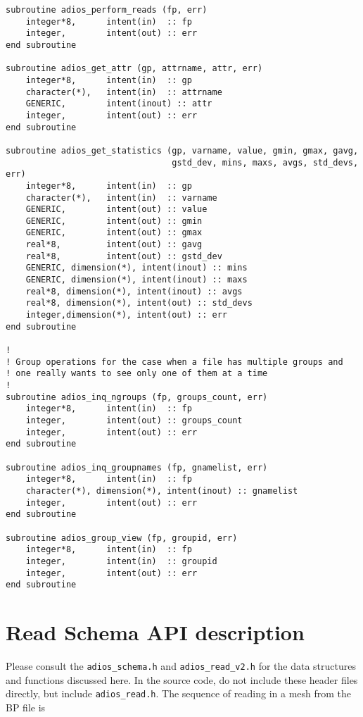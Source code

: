 \begin{lstlisting}[language=ADIOS,alsolanguage=Fortran]
subroutine adios_perform_reads (fp, err)
    integer*8,      intent(in)  :: fp
    integer,        intent(out) :: err
end subroutine

subroutine adios_get_attr (gp, attrname, attr, err)
    integer*8,      intent(in)  :: gp
    character(*),   intent(in)  :: attrname
    GENERIC,        intent(inout) :: attr
    integer,        intent(out) :: err
end subroutine

subroutine adios_get_statistics (gp, varname, value, gmin, gmax, gavg, 
                                 gstd_dev, mins, maxs, avgs, std_devs, err)
    integer*8,      intent(in)  :: gp
    character(*),   intent(in)  :: varname
    GENERIC,        intent(out) :: value
    GENERIC,        intent(out) :: gmin
    GENERIC,        intent(out) :: gmax
    real*8,         intent(out) :: gavg
    real*8,         intent(out) :: gstd_dev
    GENERIC, dimension(*), intent(inout) :: mins
    GENERIC, dimension(*), intent(inout) :: maxs
    real*8, dimension(*), intent(inout) :: avgs
    real*8, dimension(*), intent(out) :: std_devs
    integer,dimension(*), intent(out) :: err
end subroutine

!
! Group operations for the case when a file has multiple groups and 
! one really wants to see only one of them at a time
!
subroutine adios_inq_ngroups (fp, groups_count, err)
    integer*8,      intent(in)  :: fp
    integer,        intent(out) :: groups_count
    integer,        intent(out) :: err
end subroutine

subroutine adios_inq_groupnames (fp, gnamelist, err)
    integer*8,      intent(in)  :: fp
    character(*), dimension(*), intent(inout) :: gnamelist
    integer,        intent(out) :: err
end subroutine

subroutine adios_group_view (fp, groupid, err)
    integer*8,      intent(in)  :: fp
    integer,        intent(in)  :: groupid
    integer,        intent(out) :: err
end subroutine

\end{lstlisting}

%
%
\section{Read Schema API description}
Please consult the \verb+adios_schema.h+ and \verb+adios_read_v2.h+ for the data structures and functions discussed here. In the source code, do not include these header files directly, but include \verb+adios_read.h+. The sequence of reading in a mesh from the BP file is

